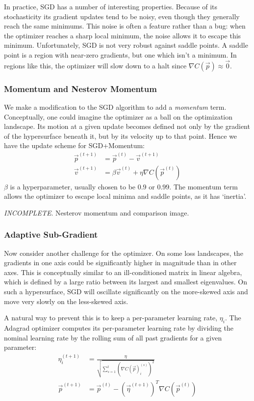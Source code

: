 \documentclass[paper=a4, fontsize=12pt]{scrartcl} %
\numberwithin{equation}{section} %
\numberwithin{figure}{section} %
\numberwithin{table}{section} %
\begin{document}
In practice, SGD has a number of interesting properties. Because of its stochasticity its gradient updates tend to be noisy, even though they generally reach the same minimums. This noise is 
often a feature rather than a bug: when the optimizer reaches a sharp local minimum, the noise allows it to escape this minimum. Unfortunately, SGD is not very robust against 
saddle points. A saddle point is a region with near-zero gradients, but one which isn't a minimum. In regions like this, the optimizer will slow down to a halt since $\nabla C(\vec{p}) \approx \vec{0}$.

\subsubsection{Momentum and Nesterov Momentum}

We make a modification to the SGD algorithm to add a \textit{momentum} term. Conceptually, one could imagine the optimizer as a ball on the 
optimization landscape. Its motion at a given update becomes defined not only by the gradient of the hypersurface beneath it, but by its velocity up to that point. Hence we have the update 
scheme for SGD+Momentum:
\begin{align*}
    \vec{p}^{(t+1)} &= \vec{p}^{(t)} - \vec{v}^{(t+1)} \\
    \vec{v}^{(t+1)} &= \beta \vec{v}^{(t)} + \eta \nabla C(\vec{p}^{(t)})
\end{align*}
$\beta$ is a hyperparameter, usually chosen to be $0.9$ or $0.99$. The momentum term allows the optimizer to escape local minima and saddle points, as it has `inertia'.

\textit{INCOMPLETE}. Nesterov momentum and comparison image.

\subsubsection{Adaptive Sub-Gradient}

Now consider another challenge for the optimizer. On some loss landscapes, the gradients in one axis could be significantly higher in magnitude than in other axes. This is conceptually similar to an ill-conditioned 
matrix in linear algebra, which is defined by a large ratio between its largest and smallest eigenvalues. On such a hypersurface, SGD will oscillate significantly on the more-skewed axis and move very slowly on the less-skewed axis.

A natural way to prevent this is to keep a per-parameter learning rate, $\eta_i$. The Adagrad optimizer computes its per-parameter learning rate by dividing the nominal learning rate by the rolling sum of all 
past gradients for a given parameter:
\begin{align*}
    \eta^{(t+1)}_i &= \frac{\eta}{\sqrt{\sum_{s=1}^t \left(\nabla C(\vec{p})^{(s)}_i \right)^2}} \\
    \vec{p}^{(t+1)} &= \vec{p}^{(t)} - \left(\vec{\eta}^{(t+1)}\right)^T \nabla C(\vec{p}^{(t)})
\end{align*}
\end{document}
